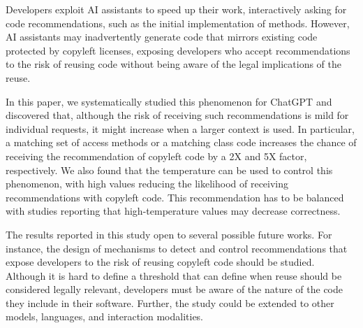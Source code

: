 \label{sec:con}
Developers exploit AI assistants to speed up their work, interactively asking for code recommendations, such as the initial implementation of methods. However, AI assistants may inadvertently generate code that mirrors existing code protected by copyleft licenses, exposing developers who accept recommendations to the risk of reusing code without being aware of the legal implications of the reuse. 

In this paper, we systematically studied this phenomenon for ChatGPT and discovered that, although the risk of receiving such recommendations is mild %
for individual requests, it might increase when a larger context is used. In particular, a matching set of access methods or a matching class code increases the chance of receiving the recommendation of copyleft code by a 2X and 5X factor, respectively. 
We also found that the temperature can be used to control this phenomenon, with high values reducing the likelihood of receiving recommendations with copyleft code. This recommendation has to be balanced with studies reporting that high-temperature values may decrease correctness. %


The results reported in this study open to several possible future works. For instance, the design of mechanisms to detect and control recommendations that expose developers to the risk of reusing copyleft code should be studied. Although it is hard to define a threshold that can define when reuse should be considered legally relevant, developers must be aware of the nature of the code they include in their software. Further, the study could be extended to other models, languages, and interaction modalities. %